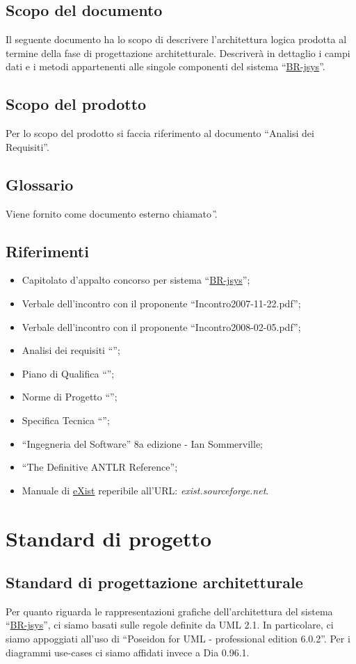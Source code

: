 \section{Scopo del documento}
Il seguente documento ha lo scopo di descrivere l'architettura logica prodotta al termine della fase di progettazione architetturale. Descriver\`a in dettaglio i campi dati e i metodi appartenenti alle singole componenti del sistema ``\underline{BR-jsys}''.
\section{Scopo del prodotto}
Per lo scopo del prodotto si faccia riferimento al documento ``Analisi dei Requisiti''.

\section{Glossario}
Viene fornito come documento esterno chiamato \G.

\section{Riferimenti}
\begin{itemize}
\item Capitolato d'appalto concorso per sistema ``\underline{BR-jsys}'';
\item Verbale dell'incontro con il proponente ``Incontro2007-11-22.pdf'';
\item Verbale dell'incontro con il proponente ``Incontro2008-02-05.pdf'';
\item Analisi dei requisiti ``\AR'';
\item Piano di Qualifica ``\PdQ'';
\item Norme di Progetto ``\NdP'';
\item Specifica Tecnica ``\ST'';
\item ``Ingegneria del Software'' 8a edizione - Ian Sommerville;
\item ``The Definitive ANTLR Reference'';
\item Manuale di \underline{eXist} reperibile all'URL: \textit{exist.sourceforge.net}.
\end{itemize}
\chapter{Standard di progetto}
\section{Standard di progettazione architetturale}
Per quanto riguarda le rappresentazioni grafiche dell'architettura del sistema ``\underline{BR-jsys}'', ci siamo basati sulle regole definite da UML 2.1. In particolare, ci siamo appoggiati all'uso di ``Poseidon for UML - professional edition 6.0.2''. Per i diagrammi use-cases ci siamo affidati invece a Dia 0.96.1.
